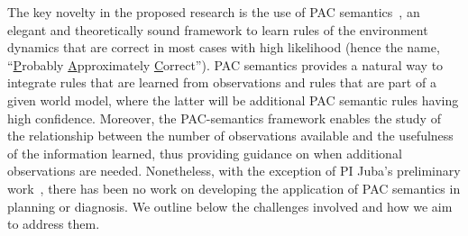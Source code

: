 \documentclass[12pt]{article}
\newcommand{\note}[1]{\textbf{\textit{#1}}}
\begin{document}
The key novelty in the proposed research is the use of PAC semantics~\cite{valiant2000robustLogics}, 
an elegant and theoretically sound framework to learn rules of the environment dynamics that are correct in most cases with high likelihood (hence the name, ``{\underline P}robably {\underline A}pproximately {\underline C}orrect''). PAC semantics provides a natural way to integrate rules that are learned from observations and rules that are part of a given world model, where the latter will be additional PAC semantic rules having high confidence. Moreover, the PAC-semantics framework enables the study of the relationship between the number of observations available and the usefulness of the information learned, thus providing guidance on when additional observations are needed. 
Nonetheless, with the exception of PI Juba's preliminary work~\cite{juba2016jmlr,juba2016aaai,zhang2017aaai}, there has been no work on developing the application of PAC semantics in planning or diagnosis. We outline below the challenges involved and how we aim to address them. 



\end{document}
